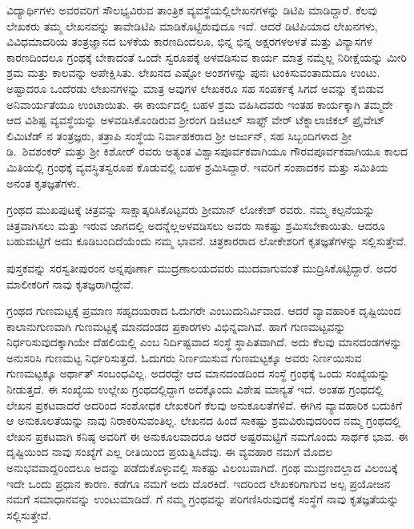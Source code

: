 {ವಿದ್ಯಾರ್ಥಿಗಳು ಅವರವರಿಗೆ ಸೌಲಭ್ಯವಿರುವ ತಾಂತ್ರಿಕ ವ್ಯವಸ್ಥೆಯಲ್ಲಿ\break ಲೇಖನಗಳನ್ನು ಡಿಟಿಪಿ ಮಾಡಿದ್ದಾರೆ. ಕೆಲವು ಲೇಖಕರು ತಮ್ಮ ಲೇಖನವನ್ನು ತಾವೇ\break ಡಿಟಿಪಿ ಮಾಡಿಕೊಟ್ಟಿರುವುದೂ ಇದೆ. ಆದರೆ ಡಿಟಿಪಿಯಾದ ಲೇಖನಗಳು, ವಿವಿಧ\break ಮಾದರಿಯ ತಂತ್ರಜ್ಞಾನದ ಬಳಕೆಯ ಕಾರಣದಿಂದಲೂ, ಭಿನ್ನ ಭಿನ್ನ ಅಕ್ಷರಗಳ\break ಅಳತೆ ಮತ್ತು ವಿನ್ಯಾಸಗಳ ಕಾರಣದಿಂದಲೂ ಗ್ರಂಥಕ್ಕೆ ಬೇಕಾದಂತೆ ಒಂದೇ \hbox{ಸ್ವರೂಪಕ್ಕೆ} ಅಳವಡಿಸುವ ಕಾರ್ಯ ಮಾತ್ರ ನಮ್ಮೆಲ್ಲ ನಿರೀಕ್ಷೆಯನ್ನು ಮೀರಿ ಶ್ರಮ ಮತ್ತು ಕಾಲವನ್ನು ಅಪೇಕ್ಷಿಸಿತು. ಲೇಖನದ ಎಷ್ಟೋ ಅಂಶಗಳನ್ನು ಪುನಃ ಟಂಕಿಸುವಂತಾದುದೂ ಉಂಟು. ಅಷ್ಟಾದರೂ ಒಂದೆರಡು ಲೇಖನಗಳನ್ನು ಮಾತ್ರ ಅವುಗಳ ಲೇಖಕರೂ ಸಹ ಸಂಪರ್ಕಕ್ಕೆ ಸಿಗದೆ ಅವನ್ನು ಕೈಬಿಡುವ ಅನಿವಾರ್ಯತೆಯೂ ಉಂಟಾಯಿತು. ಈ ಕಾರ್ಯದಲ್ಲಿ ಬಹಳ ಶ್ರಮ ವಹಿಸಿದವರು ಇಂತಹ ಕಾರ್ಯಕ್ಕಾಗಿ ತಮ್ಮದೇ ಆದ ವಿಶಿಷ್ಟ ವ್ಯವಸ್ಥೆಯನ್ನು ಅಳವಡಿಸಿಕೊಂಡಿರುವ ಶ್ರೀರಂಗ ಡಿಜಿಟಲ್ ಸಾಫ್ಟ್ ವೇರ್ ಟೆಕ್ನಾಲಾಜಿಕಲ್ \hbox{ಪ್ರೈವೇಟ್} ಲಿಮಿಟೆಡ್ ನ ತಂತ್ರಜ್ಞರು, ತತ್ರಾಪಿ ಸಂಸ್ಥೆಯ ನಿರ್ವಾಹಕರಾದ ಶ್ರೀ ಅರ್ಜುನ್, ಸಹ ಸಿಬ್ಬಂದಿಗಳಾದ ಶ್ರೀ ಡಿ.\ ಶಿವಶಂಕರ್ ಮತ್ತು ಶ್ರೀ ಕಿಶೋರ್ ರವರು ಅತ್ಯಂತ ವಿಶ್ವಾಸ\-ಪೂರ್ವಕವಾಗಿಯೂ ಗೌರವಪೂರ್ವಕವಾಗಿಯೂ ಕಾಲದ ಮಿತಿಯಲ್ಲಿ ಗ್ರಂಥಕ್ಕೆ ವ್ಯವಸ್ಥಿತ\-ಸ್ವರೂಪ ಕೊಡುವಲ್ಲಿ ಬಹಳ ಶ್ರಮಿಸಿದ್ದಾರೆ. ಇವರಿಗೆ ಸಂಪಾದಕನ ಮತ್ತು ಸಮಿತಿಯ ಅನಂತ ಕೃತಜ್ಞತೆಗಳು.

ಗ್ರಂಥದ ಮುಖಪುಟಕ್ಕೆ ಚಿತ್ರವನ್ನು ಸಾಕ್ಷಾತ್ಕರಿಸಿಕೊಟ್ಟವರು ಶ್ರೀಮಾನ್ \hbox{ಲೋಕೇಶ್} ರವರು. ನಮ್ಮ ಕಲ್ಪನೆಯನ್ನು ಚಿತ್ರವಾಗಿಸಲು ಮತ್ತು ಇರುವ ಜಾಗದಲ್ಲಿ ಅದನ್ನೆಲ್ಲ\break ಅಳವಡಿಸಲು ಅವರು ಸಾಕಷ್ಟು ಶ್ರಮಿಸಬೇಕಾಯಿತು. ಆದರೂ ಬಹುಮಟ್ಟಿಗೆ ಅದು ಕೂಡಿಬಂದಿದೆಯೆಂದು ನಮ್ಮ ಭಾವನೆ. ಚಿತ್ರಕಾರರಾದ ಲೋಕೇಶರಿಗೆ ಕೃತಜ್ಞತೆಗಳನ್ನು ಸಲ್ಲಿಸುತ್ತೇವೆ.
\newpage

ಪುಸ್ತಕವನ್ನು ಸರಸ್ವತೀಪುರಂನ ಅನ್ನಪೂರ್ಣಾ ಮುದ್ರಣಾಲಯದವರು ಮುದ\-ವಾಗುವಂತೆ ಮುದ್ರಿಸಿಕೊಟ್ಟಿದ್ದಾರೆ. ಅದರ  ಮಾಲೀಕರಿಗೆ ನಾವು ಕೃತಜ್ಞರಾಗಿದ್ದೇವೆ.
\vskip 4pt

ಗ್ರಂಥದ ಗುಣಮಟ್ಟಕ್ಕೆ ಪ್ರಮಾಣ ಸಹೃದಯರಾದ ಓದುಗರೇ ಎಂಬುದು\break ನಿರ್ವಿವಾದ. ಆದರೆ ವ್ಯಾವಹಾರಿಕ ದೃಷ್ಟಿಯಿಂದ ಕಾಲಾನುಗುಣವಾಗಿ ಗುಣಮಟ್ಟಕ್ಕೆ ಮಾನದಂಡದ ಪ್ರಕಾರಗಳು ವಿಭಿನ್ನವಾಗಿವೆ. ಹಾಗೆ ಗುಣಮಟ್ಟವನ್ನು ನಿರ್ಧರಿಸುವುದಕ್ಕಾಗಿಯೇ ದೆಹಲಿಯಲ್ಲಿ  ಎಂಬ ನಿರ್ದಿಷ್ಟವಾದ ಸಂಸ್ಥೆ ಸ್ಥಾಪಿತವಾಗಿದೆ. ಅದು ಕೆಲವು ಮಾನದಂಡಗಳನ್ನು ಅನುಸರಿಸಿ ಗುಣಮಟ್ಟ ನಿರ್ಧರಿಸುತ್ತದೆ. ಓದುಗರು ನಿರ್ಣಯಿಸುವ ಗುಣಮಟ್ಟಕ್ಕೂ ಅವರು ನಿರ್ಣಯಿಸುವ ಗುಣಮಟ್ಟಕ್ಕೂ ಅರ್ಥಾತ್ ಸಂಬಂಧವಿಲ್ಲ. ಅದರದ್ದೇ ಆದ ಮಾನದಂಡದಿಂದ ಸಂಸ್ಥೆ ಗ್ರಂಥಕ್ಕೆ ಒಂದು ಸಂಖ್ಯೆಯನ್ನು ನೀಡುತ್ತದೆ. ಈ ಸಂಖ್ಯೆಯ ಉಲ್ಲೇಖ ಗ್ರಂಥದಲ್ಲಿದ್ದಾಗ ಅದಕ್ಕೊಂದು ವಿಶೇಷ ಮಾನ್ಯತೆ ಇದೆ. ಅಂತಹ ಗ್ರಂಥದಲ್ಲಿ ಲೇಖನ ಪ್ರಕಟವಾದರೆ ಅದರಿಂದ ಸಂಶೋಧಕ ಲೇಖಕರಿಗೆ ಕೆಲವು ಅನುಕೂಲತೆ\-ಗಳಿವೆ. ಈಗಿನ ವ್ಯಾವಹಾರಿಕ ಬದುಕಿಗೆ ಆ ಅನುಕೂಲತೆಯನ್ನು ನಾವು ನಿರಾಕರಿಸುವಂತಿಲ್ಲ. ಲೇಖನದ ಹಿಂದೆ ಸಾಕಷ್ಟು ಶ್ರಮವಿರುವುದರಿಂದ ನಮ್ಮ ಗ್ರಂಥದಲ್ಲಿ ಲೇಖನ ಪ್ರಕಟವಾಗಿ ಕನಿಷ್ಠ ಅವರಿಗೆ ಈ ಅನುಕೂಲವಾದರೂ ಆದರೆ ಅಷ್ಟರಮಟ್ಟಿಗೆ ನಮಗೊಂದು ಸಾರ್ಥಕ ಭಾವ. ಈ ದೃಷ್ಟಿಯಿಂದ ನಾವು  ಸಂಖ್ಯೆಗೆ ಎಲ್ಲ ರೀತಿಯಿಂದ ಪ್ರಯತ್ನಿಸಿದೆವು. ಈ ವ್ಯವಹಾರ ನಮಗೆ ಮೊದಲ ಅನುಭವವಾದ್ದರಿಂದಲೂ ಅದನ್ನು ಪಡೆದು\-ಕೊಳ್ಳುವಲ್ಲಿ ಸಾಕಷ್ಟು ವಿಲಂಬವಾಗಿದೆ. ಗ್ರಂಥ ಮುದ್ರಣದಲ್ಲಾದ ವಿಲಂಬಕ್ಕೆ  ಇದೇ ಒಂದು ಪ್ರಧಾನ ಕಾರಣ. ಕಡೆಗೂ ನಮಗೆ ಅದು ದೊರಕಿದೆ. ಇದರಿಂದ ಲೇಖಕರಿ\-ಗಾಗುವ ಅಲ್ಪ ಪ್ರಯೋಜನ ನಮಗೆ ಸಮಾಧಾನವನ್ನು ಉಂಟುಮಾಡಿದೆ.  ಗೆ ನಮ್ಮ ಗ್ರಂಥವನ್ನು ಪರಿಗಣಿಸಿರುವುದಕ್ಕೆ ಸಂಸ್ಥೆಗೆ ನಾವು ಕೃತಜ್ಞತೆಯನ್ನು ಸಲ್ಲಿಸುತ್ತೇವೆ.
\vskip 4pt

}
